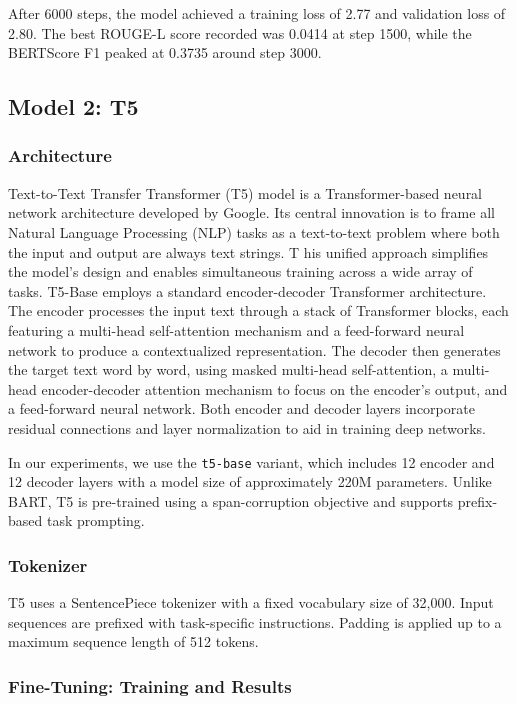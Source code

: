 \documentclass[11pt]{article}
\begin{document}
After 6000 steps, the model achieved a training loss of 2.77 and validation loss of 2.80. The best ROUGE-L score recorded was 0.0414 at step 1500, while the BERTScore F1 peaked at 0.3735 around step 3000.



\subsection{Model 2: T5}

\subsubsection{Architecture}

Text-to-Text Transfer Transformer (T5) model is a Transformer-based neural network architecture developed by Google. Its central innovation is to frame all Natural Language Processing (NLP) tasks as a text-to-text problem where both the input and output are always text strings. T
his unified approach simplifies the model's design and enables simultaneous training across a wide array of tasks. T5-Base employs a standard encoder-decoder Transformer architecture. The encoder processes the input text through a stack of Transformer blocks, each featuring a multi-head self-attention mechanism and a feed-forward neural network to produce a contextualized representation. The decoder then generates the target text word by word, using masked multi-head self-attention, a multi-head encoder-decoder attention mechanism to focus on the encoder's output, and a feed-forward neural network. 
Both encoder and decoder layers incorporate residual connections and layer normalization to aid in training deep networks. 

In our experiments, we use the \texttt{t5-base} variant, which includes 12 encoder and 12 decoder layers with a model size of approximately 220M parameters. Unlike BART, T5 is pre-trained using a span-corruption objective and supports prefix-based task prompting.

\subsubsection{Tokenizer}

T5 uses a SentencePiece tokenizer with a fixed vocabulary size of 32,000. Input sequences are prefixed with task-specific instructions. Padding is applied up to a maximum sequence length of 512 tokens.

\subsubsection{Fine-Tuning: Training and Results}
\end{document}
